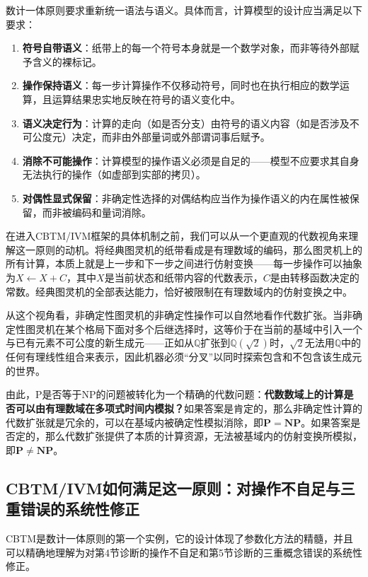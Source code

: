 \documentclass{ctexart}
\begin{document}
	数计一体原则要求重新统一语法与语义。具体而言，计算模型的设计应当满足以下要求：
	
	\begin{enumerate}
		\item \textbf{符号自带语义}：纸带上的每一个符号本身就是一个数学对象，而非等待外部赋予含义的裸标记。
		\item \textbf{操作保持语义}：每一步计算操作不仅移动符号，同时也在执行相应的数学运算，且运算结果忠实地反映在符号的语义变化中。
		\item \textbf{语义决定行为}：计算的走向（如是否分支）由符号的语义内容（如是否涉及不可公度元）决定，而非由外部量词或外部谓词事后赋予。
		\item \textbf{消除不可能操作}：计算模型的操作语义必须是自足的——模型不应要求其自身无法执行的操作（如虚部到实部的拷贝）。
		\item \textbf{对偶性显式保留}：非确定性选择的对偶结构应当作为操作语义的内在属性被保留，而非被编码和量词消除。
	\end{enumerate}
	
	在进入CBTM/IVM框架的具体机制之前，我们可以从一个更直观的代数视角来理解这一原则的动机。将经典图灵机的纸带看成是有理数域的编码，那么图灵机上的所有计算，本质上就是上一步和下一步之间进行仿射变换——每一步操作可以抽象为$X \leftarrow X + C$，其中$X$是当前状态和纸带内容的代数表示，$C$是由转移函数决定的常数。经典图灵机的全部表达能力，恰好被限制在有理数域内的仿射变换之中。
	
	从这个视角看，非确定性图灵机的非确定性操作可以自然地看作代数扩张。当非确定性图灵机在某个格局下面对多个后继选择时，这等价于在当前的基域中引入一个与已有元素不可公度的新生成元——正如从$\mathbb{Q}$扩张到$\mathbb{Q}(\sqrt{2})$时，$\sqrt{2}$无法用$\mathbb{Q}$中的任何有理线性组合来表示，因此机器必须``分叉''以同时探索包含和不包含该生成元的世界。
	
	由此，P是否等于NP的问题被转化为一个精确的代数问题：\textbf{代数数域上的计算是否可以由有理数域在多项式时间内模拟？}如果答案是肯定的，那么非确定性计算的代数扩张就是冗余的，可以在基域内被确定性模拟消除，即$\mathbf{P} = \mathbf{NP}$。如果答案是否定的，那么代数扩张提供了本质的计算资源，无法被基域内的仿射变换所模拟，即$\mathbf{P} \neq \mathbf{NP}$。
	
	\subsection{CBTM/IVM如何满足这一原则：对操作不自足与三重错误的系统性修正}
	
	CBTM是数计一体原则的第一个实例，它的设计体现了参数化方法的精髓，并且可以精确地理解为对第4节诊断的操作不自足和第5节诊断的三重概念错误的系统性修正。
	
\end{document}
